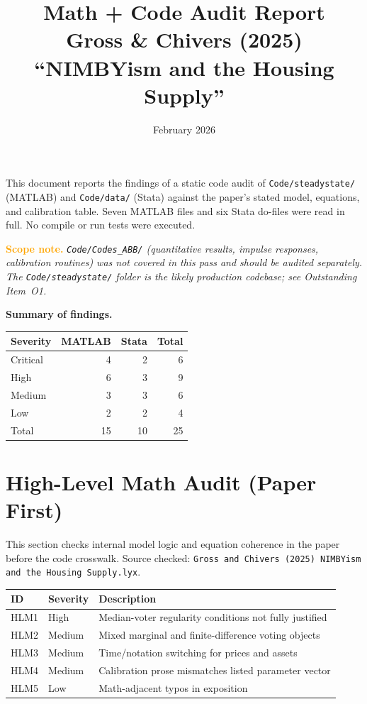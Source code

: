 \documentclass[11pt]{article}
\title{Math + Code Audit Report\\[6pt]
\large Gross \& Chivers (2025) ``NIMBYism and the Housing Supply''}
\author{}
\date{February 2026}
\begin{document}
\maketitle

\noindent This document reports the findings of a static code audit of
\texttt{Code/steadystate/} (MATLAB) and \texttt{Code/data/} (Stata)
against the paper's stated model, equations, and calibration table.
Seven MATLAB files and six Stata do-files were read in full.
No compile or run tests were executed.

\bigskip
\noindent\textcolor{orange}{\textbf{Scope note.}} \textit{%
\texttt{Code/Codes\_ABB/} (quantitative results, impulse responses,
calibration routines) was not covered in this pass and should be
audited separately. The \texttt{Code/steadystate/} folder is the
likely production codebase; see Outstanding Item~O1.}

\bigskip
\noindent\textbf{Summary of findings.}

\begin{center}
\begin{tabular}{lrrr}
\toprule
Severity & MATLAB & Stata & Total \\
\midrule
Critical & 4 & 2 & 6 \\
High     & 6 & 3 & 9 \\
Medium   & 3 & 3 & 6 \\
Low      & 2 & 2 & 4 \\
\midrule
Total    & 15 & 10 & 25 \\
\bottomrule
\end{tabular}
\end{center}

\section*{High-Level Math Audit (Paper First)}

\noindent This section checks internal model logic and equation coherence in the paper
before the code crosswalk. Source checked:
\texttt{Gross and Chivers (2025) NIMBYism and the Housing Supply.lyx}.

\begin{center}
\begin{tabular}{lll}
\toprule
ID & Severity & Description \\
\midrule
HLM1 & High & Median-voter regularity conditions not fully justified \\
HLM2 & Medium & Mixed marginal and finite-difference voting objects \\
HLM3 & Medium & Time/notation switching for prices and assets \\
HLM4 & Medium & Calibration prose mismatches listed parameter vector \\
HLM5 & Low & Math-adjacent typos in exposition \\
\bottomrule
\end{tabular}
\end{center}
\end{document}
